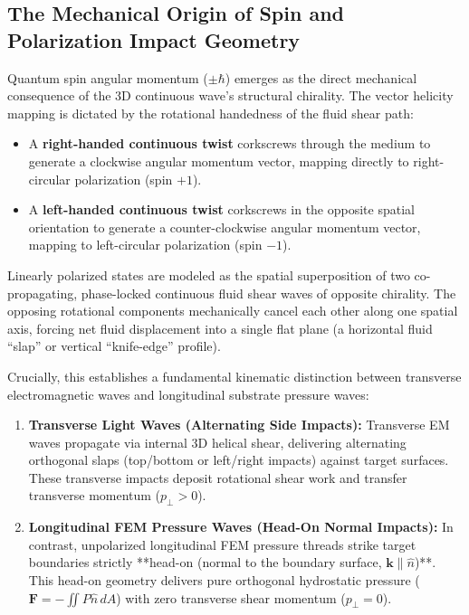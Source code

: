 \documentclass[11pt,a4paper]{article}
\begin{document}
	\subsection{The Mechanical Origin of Spin and Polarization Impact Geometry}
	Quantum spin angular momentum ($\pm\hbar$) emerges as the direct mechanical consequence of the 3D continuous wave's structural chirality. The vector helicity mapping is dictated by the rotational handedness of the fluid shear path:
	\begin{itemize}
		\item A \textbf{right-handed continuous twist} corkscrews through the medium to generate a clockwise angular momentum vector, mapping directly to right-circular polarization (spin $+1$).
		\item A \textbf{left-handed continuous twist} corkscrews in the opposite spatial orientation to generate a counter-clockwise angular momentum vector, mapping to left-circular polarization (spin $-1$).
	\end{itemize}
	Linearly polarized states are modeled as the spatial superposition of two co-propagating, phase-locked continuous fluid shear waves of opposite chirality. The opposing rotational components mechanically cancel each other along one spatial axis, forcing net fluid displacement into a single flat plane (a horizontal fluid ``slap'' or vertical ``knife-edge'' profile).
	
	Crucially, this establishes a fundamental kinematic distinction between transverse electromagnetic waves and longitudinal substrate pressure waves:
	\begin{enumerate}
		\item \textbf{Transverse Light Waves (Alternating Side Impacts):} Transverse EM waves propagate via internal 3D helical shear, delivering alternating orthogonal slaps (top/bottom or left/right impacts) against target surfaces. These transverse impacts deposit rotational shear work and transfer transverse momentum ($p_\perp > 0$).
		\item \textbf{Longitudinal FEM Pressure Waves (Head-On Normal Impacts):} In contrast, unpolarized longitudinal FEM pressure threads strike target boundaries strictly **head-on (normal to the boundary surface, $\mathbf{k} \parallel \hat{n}$)**. This head-on geometry delivers pure orthogonal hydrostatic pressure ($\mathbf{F} = -\iint P \hat{n} \, dA$) with zero transverse shear momentum ($p_\perp = 0$).
	\end{enumerate}
	
\end{document}
